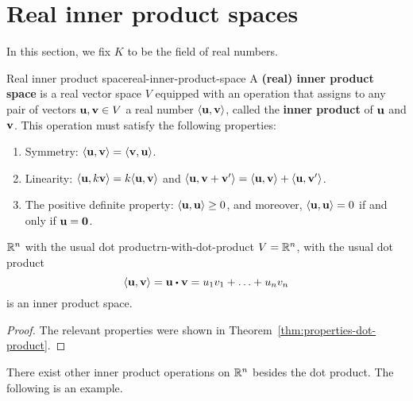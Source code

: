 \section{Real inner product spaces}

In this section, we fix $K$ to be the field of real numbers.

\begin{definition}{Real inner product space}{real-inner-product-space}
  A \textbf{(real) inner product space}%
   is a real vector space $V$ equipped
  with an operation that assigns to any pair of vectors
  $\mbox{\bf u},\mbox{\bf v}\in V$ a real number $\langle\mbox{\bf u},\mbox{\bf v}\rangle$,
  called the \textbf{inner product}%
   of $\mbox{\bf u}$ and $\mbox{\bf v}$. This
  operation must satisfy the following properties:
  \begin{enumerate}
  \item Symmetry: $\langle\mbox{\bf u},\mbox{\bf v}\rangle = \langle\mbox{\bf v},\mbox{\bf u}\rangle$.
  \item Linearity:
    $\langle\mbox{\bf u},k\mbox{\bf v}\rangle = k\langle\mbox{\bf u},\mbox{\bf v}\rangle$ and
    $\langle\mbox{\bf u},\mbox{\bf v}+\mbox{\bf v}'\rangle = \langle\mbox{\bf u},\mbox{\bf v}\rangle +
    \langle\mbox{\bf u},\mbox{\bf v}'\rangle$.
  \item The positive definite property: $\langle\mbox{\bf u},\mbox{\bf u}\rangle
    \geq 0$, and moreover, $\langle\mbox{\bf u},\mbox{\bf u}\rangle=0$ if and only
    if $\mbox{\bf u} = \mbox{\bf 0}$.
  \end{enumerate}
\end{definition}

\begin{example}{$\mathbb{R}^n$ with the usual dot product}{rn-with-dot-product}
  $V=\mathbb{R}^n$, with the usual dot product
  \begin{equation*}
    \iprod{\vect{u},\vect{v}} = \vect{u}\dotprod\vect{v} =
    u_1v_1 + \ldots + u_nv_n
  \end{equation*}
  is an inner product space.
\end{example}

\begin{proof}
  The relevant properties were shown in
  Theorem~\ref{thm:properties-dot-product}.
\end{proof}

There exist other inner product operations on $\mathbb{R}^n$ besides the dot
product. The following is an example.

